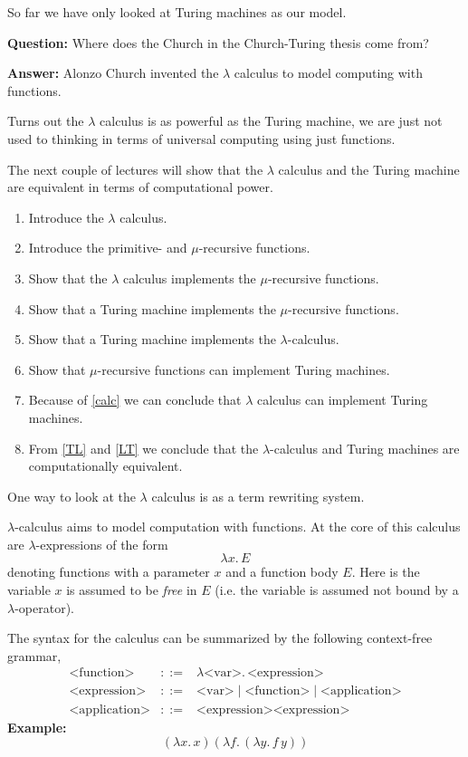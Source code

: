 \documentclass[a4paper,blends,pdf,colorBG,slideColor]{prosper}
\begin{document}
So far we have only looked at Turing machines as our model.  

{\bf Question:} Where does the Church in the Church-Turing thesis  come from?

{\bf Answer:} Alonzo Church invented the $\lambda$ calculus to model computing with functions.

Turns out the $\lambda$ calculus is as powerful as the Turing machine, we are just not used to thinking
in terms of universal computing using just functions.
\es

The next couple of lectures will show that the $\lambda$ calculus and the Turing machine are equivalent in terms
of computational power.
\begin{enumerate}
\item Introduce the $\lambda$ calculus.
\item Introduce the primitive- and $\mu$-recursive functions.
\item \label{calc} Show that the $\lambda$ calculus implements the $\mu$-recursive functions.
\item Show that a Turing machine implements the $\mu$-recursive functions.
\item \label{TL}Show that a Turing machine implements the $\lambda$-calculus.
\item Show that $\mu$-recursive functions can implement Turing machines.
\item \label{LT}Because of \ref{calc} we can conclude that $\lambda$ calculus can implement Turing machines.
\item From \ref{TL} and \ref{LT} we conclude that the $\lambda$-calculus and Turing machines are computationally equivalent. 
\end{enumerate}

One way to look at the $\lambda$ calculus is as a term rewriting system.
\es


$\lambda$-calculus aims to model computation with functions.  At the
core of this calculus are $\lambda$-expressions of the form
\[
\lambda x.\,E
\]
denoting functions with a parameter $x$ and a function body $E$.  Here is the variable $x$ is assumed to be
{\em free} in $E$ (i.e. the variable is assumed not bound by a $\lambda$-operator).

The syntax for the calculus can be summarized by the following context-free grammar,
\begin{eqnarray*}
\mbox{<function>} &::=& \lambda \mbox{<var>}.\,\mbox{<expression>}\\
\mbox{<expression>} &::=& \mbox{<var>} \mid \mbox{<function>} \mid \mbox{<application>}\\
\mbox{<application>} &::=& \mbox{<expression>}\mbox{<expression>}
\end{eqnarray*}
{\bf Example:}
\[
(\lambda x.\, x)(\lambda f.\, (\lambda y.\, f \, y))
\]
\end{document}
